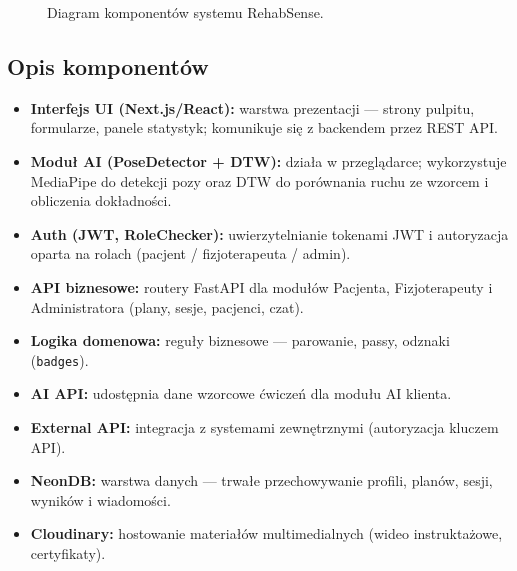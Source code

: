 \documentclass[11pt,a4paper]{article}
\begin{document}
\begin{figure}[ht]
{}
\caption{Diagram komponentów systemu RehabSense.}
\end{figure}

\subsection{Opis komponentów}
\begin{itemize}
  \item \textbf{Interfejs UI (Next.js/React):} warstwa prezentacji — strony pulpitu, formularze, panele statystyk; komunikuje się z backendem przez REST API.
  \item \textbf{Moduł AI (PoseDetector + DTW):} działa w przeglądarce; wykorzystuje MediaPipe do detekcji pozy oraz DTW do porównania ruchu ze wzorcem i obliczenia dokładności.
  \item \textbf{Auth (JWT, RoleChecker):} uwierzytelnianie tokenami JWT i autoryzacja oparta na rolach (pacjent / fizjoterapeuta / admin).
  \item \textbf{API biznesowe:} routery FastAPI dla modułów Pacjenta, Fizjoterapeuty i Administratora (plany, sesje, pacjenci, czat).
  \item \textbf{Logika domenowa:} reguły biznesowe — parowanie, passy, odznaki (\texttt{badges}).
  \item \textbf{AI API:} udostępnia dane wzorcowe ćwiczeń dla modułu AI klienta.
  \item \textbf{External API:} integracja z systemami zewnętrznymi (autoryzacja kluczem API).
  \item \textbf{NeonDB:} warstwa danych — trwałe przechowywanie profili, planów, sesji, wyników i wiadomości.
  \item \textbf{Cloudinary:} hostowanie materiałów multimedialnych (wideo instruktażowe, certyfikaty).
\end{itemize}
\end{document}
